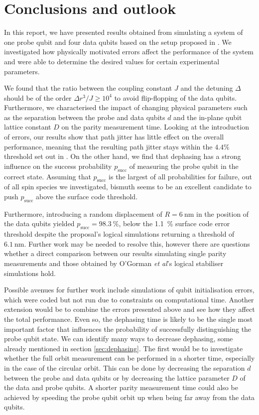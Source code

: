 
\section{Conclusions and outlook} \label{sec:conclusions}
In this report, we have presented results obtained from simulating a system of one probe qubit and four data qubits based on the setup proposed in \cite{OGorman2016}. We investigated how physically motivated errors affect the performance of the system and were able to determine the desired values for certain experimental parameters. 

We found that the ratio between the coupling constant $J$ and the detuning $\Delta$ should be of the order $\Delta r^3/J \ge 10^4$ to avoid flip-flopping of the data qubits. Furthermore, we characterised the impact of changing physical parameters such as the separation between the probe and data qubits $d$ and the in-plane qubit lattice constant $D$ on the parity measurement time.  
Looking at the introduction of errors, our results show that path jitter has little effect on the overall performance, meaning that the resulting path jitter stays within the $4.4\%$ threshold set out in \cite{OGorman2016}. On the other hand, we find that dephasing has a strong influence on the success probability $p_{\textrm{succ}}$ of measuring the probe qubit in the correct state. Assuming that $p_{\textrm{succ}}$ is the largest of all probabilities for failure, out of all spin species we investigated, bismuth seems to be an excellent candidate to push $p_{\textrm{succ}}$ above the surface code threshold.

Furthermore, introducing a random displacement of $R = \SI{6}{\nano\metre}$ in the position of the data qubits yielded $p_{\textrm{succ}} = \SI{98.3}{\percent}$, below the \SI{1.1}{\percent} surface code error threshold \hbox{\cite{Wang2011,Fowler2012}} despite the proposal's logical simulations returning a threshold of $\SI{6.1}{\nano\metre}$. Further work may be needed to resolve this, however there are questions whether a direct comparison between our results simulating single parity measurements and those obtained by O'Gorman \textit{et al}'s logical stabiliser simulations hold.




Possible avenues for further work include simulations of qubit initialisation errors, which were coded but not run due to constraints on computational time. Another extension would be to combine the errors presented above and see how they affect the total performance. Even so, the dephasing time is likely to be the single most important factor that influences the probability of successfully distinguishing the probe qubit state. We can identify many ways to decrease dephasing, some already mentioned in section \ref{sec:dephasing}. The first would be to investigate whether the full orbit measurement can be performed in a shorter time, especially in the case of the circular orbit. This can be done by decreasing the separation $d$ between the probe and data qubits or by decreasing the lattice parameter $D$ of the data and probe qubits. A shorter parity measurement time could also be achieved by speeding the probe qubit orbit up when being far away from the data qubits. 

